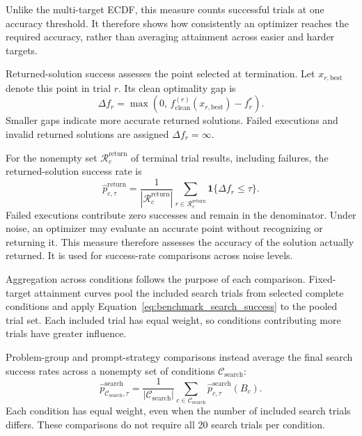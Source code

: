 Unlike the multi-target ECDF, this measure counts successful trials
at one accuracy threshold. It therefore shows how consistently an
optimizer reaches the required accuracy, rather than averaging
attainment across easier and harder targets.

Returned-solution success assesses the point selected at termination.
Let $x_{r,\mathrm{best}}$ denote this point in trial $r$. Its clean
optimality gap is
\begin{equation}
    \Delta f_r
    =
    \max\!\left(
        0,\,
        f_{\mathrm{clean}}^{(r)}(x_{r,\mathrm{best}})-f_r^*
    \right).
    \label{eq:benchmark_final_gap}
\end{equation}
Smaller gaps indicate more accurate returned solutions. Failed executions
and invalid returned solutions are assigned $\Delta f_r=\infty$.

For the nonempty set $\mathcal R_c^{\mathrm{return}}$ of terminal
trial results, including failures, the returned-solution success rate is
\begin{equation}
    \widehat p_{c,\tau}^{\mathrm{return}}
    =
    \frac{1}{|\mathcal R_c^{\mathrm{return}}|}
    \sum_{r\in\mathcal R_c^{\mathrm{return}}}
    \mathbf{1}\{\Delta f_r\leq\tau\}.
    \label{eq:benchmark_return_reliability}
\end{equation}
Failed executions contribute zero successes and remain in the
denominator. Under noise, an optimizer may evaluate an accurate point
without recognizing or returning it. This measure therefore assesses
the accuracy of the solution actually returned. It is used for
success-rate comparisons across noise levels.

Aggregation across conditions follows the purpose of each comparison.
Fixed-target attainment curves pool the included search trials from
selected complete conditions and apply
Equation~\ref{eq:benchmark_search_success} to the pooled trial set.
Each included trial has equal weight, so conditions contributing more
trials have greater influence.

Problem-group and prompt-strategy comparisons instead average the
final search success rates across a nonempty set of conditions
$\mathcal C_{\mathrm{search}}$:
\begin{equation}
    \widehat p_{\mathcal C_{\mathrm{search}},\tau}^{\mathrm{search}}
    =
    \frac{1}{|\mathcal C_{\mathrm{search}}|}
    \sum_{c\in\mathcal C_{\mathrm{search}}}
    \widehat p_{c,\tau}^{\mathrm{search}}(B_c).
    \label{eq:benchmark_aggregate_search_success}
\end{equation}
Each condition has equal weight, even when the number of included
search trials differs. These comparisons do not require all 20
search trials per condition.

